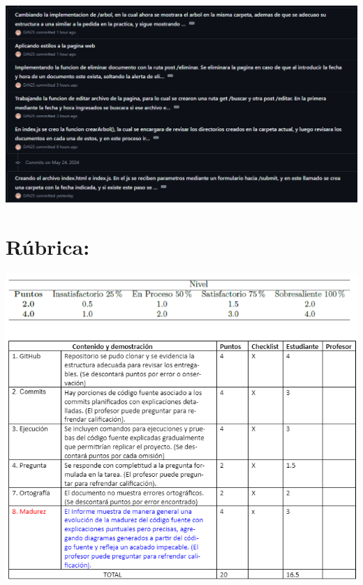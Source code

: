 \documentclass{article}
\begin{document}
\includegraphics[width=\textwidth]{img/commits.png}
\section{Rúbrica:}




\includegraphics[width=\textwidth]{img/rubrica.png}
\end{document}
